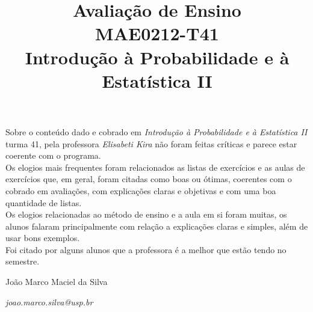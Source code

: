 \documentclass{article}
\date{%
	}
\title{Avaliação de Ensino\\
       MAE0212-T41\\
       Introdução à Probabilidade e à Estatística II}
\author{}
\begin{document}
\maketitle
\thispagestyle{empty}

\indent Sobre o conteúdo dado e cobrado em \textit{Introdução à Probabilidade e à Estatística II} turma 41, 
pela professora \textit{Elisabeti Kira} não foram feitas críticas e parece estar coerente com o programa.\\
\indent Os elogios mais frequentes foram relacionados as listas de exercícios e as aulas de exercícios que, em geral,
foram citadas como boas ou ótimas, coerentes com o cobrado em avaliações, com explicações claras e objetivas e com uma
boa quantidade de listas.\\
\indent Os elogios relacionadas ao método de ensino e a aula em si foram muitas, os alunos falaram principalmente
 com relação a explicações claras e simples, além de usar bons exemplos.\\
\indent Foi citado por alguns alunos que a professora é a melhor que estão tendo no semestre.


 

\vspace{6ex}

João Marco Maciel da Silva

\emph{joao.marco.silva@usp.br}





\end{document}
